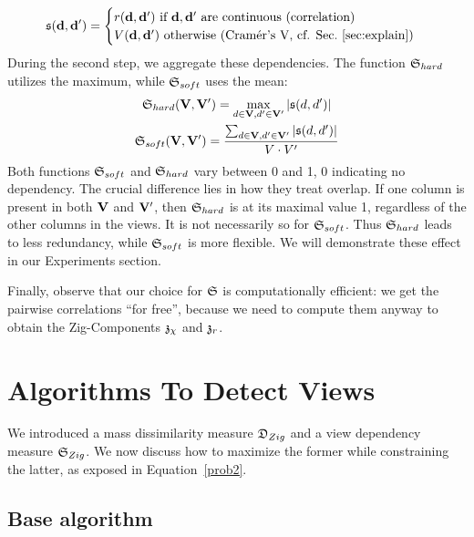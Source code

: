 \begin{equation}
    \mathfrak{s}(\mathbf{d}, \mathbf{d}')= \begin{cases}
        r(\mathbf{d}, \mathbf{d}')\ \text{if $\bf{d}, \bf{d}'$ are continuous (correlation)}\\
        V(\mathbf{d}, \mathbf{d}')\ \text{otherwise (Cram\'er's V, cf.
        Sec.~\ref{sec:explain})}
         \end{cases}
\end{equation}
During the second step, we aggregate these dependencies. The function
$\mathfrak{S}_{hard}$ utilizes the maximum, while $\mathfrak{S}_{soft}$ uses the mean:
\begin{gather}
    \mathfrak{S}_{hard}(\mathbf{V}, \mathbf{V}') = \max_{d \in \mathbf{V}, d' \in \mathbf{V}'} |\mathfrak{s}(d, d')|
    \label{eq:hard}\\
    \mathfrak{S}_{soft}(\mathbf{V}, \mathbf{V}') = 
    \frac{\sum_{d \in \mathbf{V}, d' \in \mathbf{V}'} |\mathfrak{s}(d, d')|}
    {V \cdot V'}
    \label{eq:soft}
\end{gather}
Both functions $\mathfrak{S}_{soft}$ and $\mathfrak{S}_{hard}$ vary between 0 and 1, 0
indicating no dependency. The crucial difference lies in how they treat
overlap. If one column is present in both $\mathbf{V}$ and $\mathbf{V}'$, then
$\mathfrak{S}_{hard}$ is at its maximal value 1, regardless of the other columns in
the views. It is not necessarily so for $\mathfrak{S}_{soft}$. Thus
$\mathfrak{S}_{hard}$ leads to less redundancy, while $\mathfrak{S}_{soft}$ is more
flexible. We will demonstrate these effect in our Experiments section.

Finally, observe that our choice for $\mathfrak{S}$ is computatio\-nal\-ly efficient: we
get the pairwise correlations ``for free'', because we need to compute them
anyway to obtain the Zig-Components $\mathfrak{z}_{\chi}$ and $\mathfrak{z}_r$.

\section{Algorithms To Detect Views}
\label{sec:algorithm}

We introduced a mass dissimilarity measure $\mathfrak{D}_{Zig}$ and a view dependency
measure $\mathfrak{S}_{Zig}$. We now discuss how to maximize the former while
constraining the latter, as exposed in Equation~\ref{prob2}.

\subsection{Base algorithm}
\label{sec:overview}

